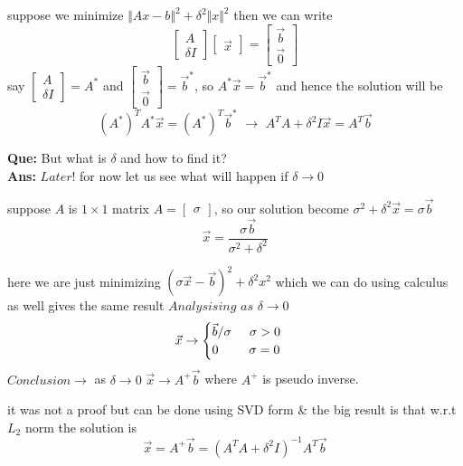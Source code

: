 \documentclass[a4paper]{article}
\numberwithin{equation}{section}
\begin{document}
\begin{itemize}
suppose we minimize $\Vert Ax-b\Vert^2+{{\delta}^2\Vert x\Vert^2}$ then we can write 
\[\begin{bmatrix}
    A\\\delta I
\end{bmatrix}\begin{bmatrix}
    \vec{x}
\end{bmatrix}=\begin{bmatrix}
    \vec{b}\\\vec{0}
\end{bmatrix}
\]
say $\begin{bmatrix}
    A\\\delta I
\end{bmatrix}=A^*$ and $\begin{bmatrix}
    \vec{b}\\\vec{0}
\end{bmatrix}=\vec{b}^*$, so $A^*\vec{x}=\vec{b}^*$ and hence the solution will be
\[(A^*)^TA^*\vec{x}=(A^*)^T\vec{b}^* \hspace{4pt} \rightarrow \hspace{4pt} A^TA+\delta^2 I\vec{x}=A^T\vec{b}\]

\textbf{Que:} But what is $\delta$ and how to find it?\\
\textbf{Ans:} $Later!$ for now let us see what will happen if $\delta \rightarrow 0$

suppose $A$ is $1\times 1$ matrix $A=\begin{bmatrix}\sigma \end{bmatrix}$, so our solution become $\sigma^2+\delta^2 \vec{x}=\sigma \vec{b}$
\[\vec{x}=\frac{\sigma \vec{b}}{\sigma^2+\delta^2 }\]

here we are just minimizing $(\sigma \vec{x}-\vec{b})^2+\delta^2x^2$ which we can do using calculus as well gives the same result $Analysising \hspace{4pt}as \hspace{4pt} \delta\rightarrow0$
\[\vec{x} \rightarrow 
\begin{cases}
    \vec{b}/{\sigma} \hspace{0.5cm} \sigma>0\\
    0 \hspace{0.85cm} \sigma=0\\
\end{cases}\]
$Conclusion \rightarrow$ as $\delta \rightarrow0$ $\vec{x} \rightarrow A^+\vec{b}$ where $A^+$ is pseudo inverse.

it was not a proof but can be done using SVD form \& the big result is that w.r.t $L_2$ norm the solution is\[\vec{x}=A^+\vec{b}=(A^TA+\delta^2I)^{-1}A^T \vec{b}\]


\end{itemize}
\end{document}

